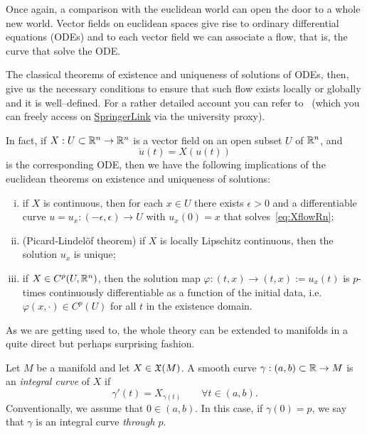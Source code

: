 Once again, a comparison with the euclidean world can open the door to a whole new world.
Vector fields on euclidean spaces give rise to ordinary differential equations (ODEs) and to each vector field we can associate a flow, that is, the curve that solve the ODE.

The classical theorems of existence and uniqueness of solutions of ODEs, then, give us the necessary conditions to ensure that such flow exists locally or globally and it is well--defined.
For a rather detailed account you can refer to~\cite[Chapters 3.2 and 3.3]{book:knauf} (which you can freely access on \href{https://link.springer.com/book/10.1007\%2F978-3-662-55774-7}{SpringerLink} via the university proxy).

In fact, if $X: U\subset\mathbb{R}^n \to \mathbb{R}^n$ is a vector field on an open subset $U$ of $\mathbb{R}^n$, and
\begin{equation}\label{eq:XflowRn}
  \dot u(t) = X(u(t))
\end{equation}
is the corresponding ODE, then we have the following implications of the euclidean theorems on existence and uniqueness of solutions:
\begin{enumerate}[(i)]
  \item if $X$ is continuous, then for each $x\in U$ there exists $\epsilon > 0$ and a differentiable curve $u = u_{x} : (-\epsilon, \epsilon) \to U$ with $u_x(0) = x$ that solves~\eqref{eq:XflowRn};
  \item (Picard-Lindel\"of theorem) if $X$ is locally Lipschitz continuous, then the solution $u_x$ is unique;
  \item if $X\in C^p(U,\mathbb{R}^n)$, then the solution map $\varphi : (t, x) \to (t, x) := u_x (t)$ is $p$-times continuously differentiable as a function of the initial data, i.e. $\varphi(x, \cdot)\in C^p(U)$ for all $t$ in the existence domain.
\end{enumerate}

As we are getting used to, the whole theory can be extended to manifolds in a quite direct but perhaps surprising fashion.

\begin{definition}
  Let $M$ be a manifold and let $X\in\mathfrak{X}(M)$.
  A smooth curve $\gamma: (a,b)\subset\mathbb{R} \to M$ is an \emph{integral curve} of $X$ if
  \begin{equation}\label{eq:integralCurve}
    \gamma'(t) = X_{\gamma(t)} \qquad \forall t\in(a,b).
  \end{equation}
  Conventionally, we assume that $0\in(a,b)$. In this case, if $\gamma(0)=p$, we say that $\gamma$ is an integral curve \emph{through $p$}.
\end{definition}

